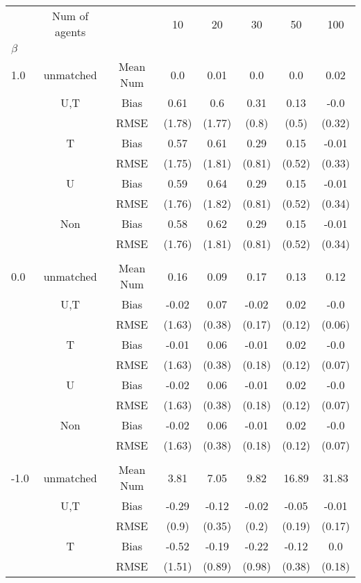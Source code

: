 \begin{tabular}{@{\extracolsep{5pt}}lc|cccccc}
\toprule 
 & Num of agents &  & 10 & 20 & 30 & 50 & 100 \\
$\beta$ &  &  &  &  &  &  &  \\
\midrule 
1.0 & unmatched & Mean Num & 0.0 & 0.01 & 0.0 & 0.0 & 0.02 \\
 & U,T & Bias & 0.61 & 0.6 & 0.31 & 0.13 & -0.0 \\
 &  & RMSE & (1.78) & (1.77) & (0.8) & (0.5) & (0.32) \\
 & T & Bias & 0.57 & 0.61 & 0.29 & 0.15 & -0.01 \\
 &  & RMSE & (1.75) & (1.81) & (0.81) & (0.52) & (0.33) \\
 & U & Bias & 0.59 & 0.64 & 0.29 & 0.15 & -0.01 \\
 &  & RMSE & (1.76) & (1.82) & (0.81) & (0.52) & (0.34) \\
 & Non & Bias & 0.58 & 0.62 & 0.29 & 0.15 & -0.01 \\
 &  & RMSE & (1.76) & (1.81) & (0.81) & (0.52) & (0.34) \\
 &  &  &  &  &  &  &  \\
0.0 & unmatched & Mean Num & 0.16 & 0.09 & 0.17 & 0.13 & 0.12 \\
 & U,T & Bias & -0.02 & 0.07 & -0.02 & 0.02 & -0.0 \\
 &  & RMSE & (1.63) & (0.38) & (0.17) & (0.12) & (0.06) \\
 & T & Bias & -0.01 & 0.06 & -0.01 & 0.02 & -0.0 \\
 &  & RMSE & (1.63) & (0.38) & (0.18) & (0.12) & (0.07) \\
 & U & Bias & -0.02 & 0.06 & -0.01 & 0.02 & -0.0 \\
 &  & RMSE & (1.63) & (0.38) & (0.18) & (0.12) & (0.07) \\
 & Non & Bias & -0.02 & 0.06 & -0.01 & 0.02 & -0.0 \\
 &  & RMSE & (1.63) & (0.38) & (0.18) & (0.12) & (0.07) \\
 &  &  &  &  &  &  &  \\
-1.0 & unmatched & Mean Num & 3.81 & 7.05 & 9.82 & 16.89 & 31.83 \\
 & U,T & Bias & -0.29 & -0.12 & -0.02 & -0.05 & -0.01 \\
 &  & RMSE & (0.9) & (0.35) & (0.2) & (0.19) & (0.17) \\
 & T & Bias & -0.52 & -0.19 & -0.22 & -0.12 & 0.0 \\
 &  & RMSE & (1.51) & (0.89) & (0.98) & (0.38) & (0.18) \\

\end{tabular}
